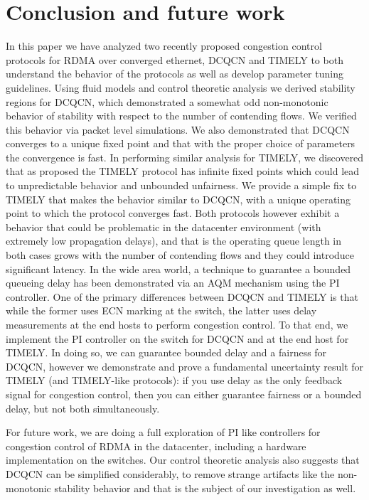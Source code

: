\section{Conclusion and future work}
In this paper we have analyzed two recently proposed congestion control
protocols for RDMA over converged ethernet, DCQCN and TIMELY to both
understand the behavior of the protocols as well as develop parameter
tuning guidelines. Using
fluid models and control theoretic analysis we derived stability regions
for DCQCN, which demonstrated a somewhat odd non-monotonic behavior of
stability with respect to the number of contending flows. We verified
this behavior via packet level simulations. We also demonstrated that DCQCN
converges to a unique fixed point and that with the proper choice of
parameters the convergence is fast. In performing similar analysis
for TIMELY, we discovered that as proposed the TIMELY protocol has
infinite fixed points which could lead to unpredictable behavior and
unbounded unfairness. We provide a simple fix to TIMELY that makes the
behavior similar to DCQCN, with a unique operating point to which the
protocol converges fast. Both protocols however exhibit a behavior that
could be problematic in the datacenter environment (with extremely low
propagation delays), and that is the
operating queue length in both cases grows with the number of
contending flows and they could introduce significant latency. In the
wide area world, a technique to guarantee a bounded queueing delay has
been demonstrated via an AQM mechanism using the PI controller. One of
the primary differences between DCQCN and TIMELY is that while the
former uses ECN marking at the switch, the latter uses delay
measurements at the end hosts to perform congestion control. To that
end, we implement the PI controller on the switch for DCQCN and at the
end host for TIMELY. In doing so, we can guarantee bounded delay and a
fairness for
DCQCN, however we demonstrate and prove a fundamental uncertainty
result for TIMELY (and TIMELY-like protocols): if you use delay as the only
feedback signal for congestion control, then you can either guarantee
fairness or a bounded delay, but not both simultaneously.

For future work, we are doing a full exploration of PI like
controllers for congestion control of RDMA in the datacenter,
including a hardware implementation on the switches. Our control
theoretic analysis also suggests that DCQCN can be simplified
considerably, to remove strange artifacts like the non-monotonic
stability behavior and that is the subject of our investigation as well.


